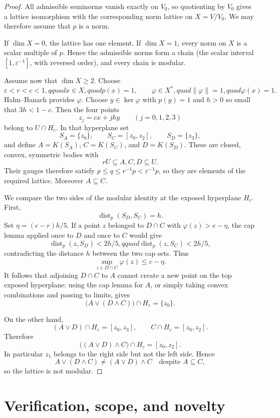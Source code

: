 \documentclass[11pt]{article}
\newcommand{\dist}{\operatorname{dist}}
\begin{document}
\begin{proof}
All admissible seminorms vanish exactly on $V_0$, so quotienting by $V_0$
gives a lattice isomorphism with the corresponding norm lattice on
$X=V/V_0$.  We may therefore assume that $p$ is a norm.

If $\dim X=0$, the lattice has one element.  If $\dim X=1$, every norm on
$X$ is a scalar multiple of $p$.  Hence the admissible norms form a chain
(the scalar interval $[1,\varepsilon^{-1}]$, with reversed order), and every
chain is modular.

Assume now that $\dim X\ge2$.  Choose
\[
 \varepsilon<r<c<1,qquad x\in X,quad p(x)=1,
 \qquad \varphi\in X^*,quad \|\varphi\|=1,quad\varphi(x)=1.
\]
Hahn--Banach provides $\varphi$.  Choose $y\in\ker\varphi$ with $p(y)=1$
and $h>0$ so small that $3h<1-c$.  Then the four points
\[
 z_j=cx+jhy\qquad(j=0,1,2,3)
\]
belong to $U\cap H_c$.  In that hyperplane set
\[
 S_A=\{z_0\},\qquad S_C=[z_0,z_2],\qquad S_D=\{z_3\},
\]
and define $A=K(S_A)$, $C=K(S_C)$, and $D=K(S_D)$.  These are closed,
convex, symmetric bodies with
\[
 rU\subseteq A,C,D\subseteq U.
\]
Their gauges therefore satisfy
$p\le q\le r^{-1}p<\varepsilon^{-1}p$, so they are elements of the required
lattice.  Moreover $A\subseteq C$.

We compare the two sides of the modular identity at the exposed hyperplane
$H_c$.  First,
\[
 \dist_p(S_D,S_C)=h.
\]
Set $\eta=(c-r)h/5$.  If a point $z$ belonged to $D\cap C$ with
$\varphi(z)>c-\eta$, the cap lemma applied once to $D$ and once to $C$ would
give
\[
 \dist_p(z,S_D)<2h/5,qquad \dist_p(z,S_C)<2h/5,
\]
contradicting the distance $h$ between the two cap sets.  Thus
\[
 \sup_{z\in D\cap C}\varphi(z)\le c-\eta.
\]
It follows that adjoining $D\cap C$ to $A$ cannot create a new point on the
top exposed hyperplane: using the cap lemma for $A$, or simply taking
convex combinations and passing to limits, gives
\[
 \bigl(A\vee(D\wedge C)\bigr)\cap H_c=\{z_0\}.
\]

On the other hand,
\[
 (A\vee D)\cap H_c=[z_0,z_3],
 \qquad C\cap H_c=[z_0,z_2].
\]
Therefore
\[
 \bigl((A\vee D)\wedge C\bigr)\cap H_c=[z_0,z_2].
\]
In particular $z_1$ belongs to the right side but not the left side.  Hence
\[
 A\vee(D\wedge C)\ne(A\vee D)\wedge C
 \quad\text{despite }A\subseteq C,
\]
so the lattice is not modular.
\end{proof}

\section{Verification, scope, and novelty}
\end{document}
